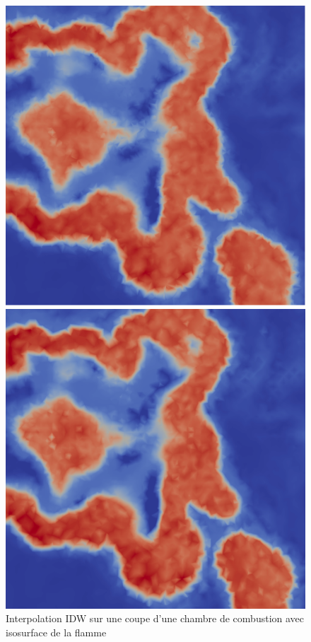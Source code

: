 \begin{figure}[H]
    \centering
    \begin{minipage}[b]{0.47\textwidth}
        \centering
        \includegraphics[width=\textwidth]{images/cb_IDW2.png} %
        \caption{Interpolation IDW sur une coupe d'une chambre de combustion avec isosurface de la flamme}
        \label{fig:cb-IDW}
    \end{minipage}
    \hspace{0.02\textwidth} %
    \begin{minipage}[b]{0.47\textwidth}
        \centering
        \includegraphics[width=\textwidth]{images/cb_lineaire2.png} %

\end{minipage}
\end{figure}
